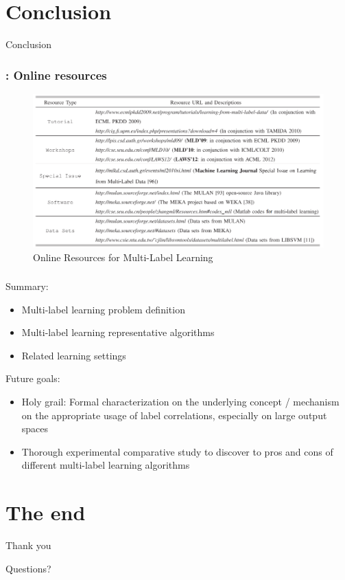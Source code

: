 \documentclass{beamer}
\begin{document}
\section{Conclusion}
\begin{frame}
\Huge{\centerline{Conclusion}}
\end{frame}
\begin{frame}
\frametitle{\insertsection : Online resources}
\begin{figure}
	\begin{center}
		\includegraphics[scale = 0.47]{images/online.png}
		\caption{Online Resources for Multi-Label Learning}
	\end{center}
\end{figure}
\end{frame}
\begin{frame}
\frametitle{\insertsection}
Summary:
\begin{itemize}
	\item Multi-label learning problem definition 
	\item Multi-label learning representative algorithms
	\item Related learning settings
\end{itemize}

Future goals:
\begin{itemize}
	\item Holy grail: Formal characterization on the underlying concept / mechanism on the appropriate usage of label correlations, especially on large output spaces
	\item Thorough experimental comparative study to discover to pros and cons of different multi-label learning algorithms
\end{itemize}
\end{frame}

\section{The end}
\begin{frame}
\Huge{\centerline{Thank you}}
\Huge{\centerline{Questions?}}
\end{frame}
\end{document}
